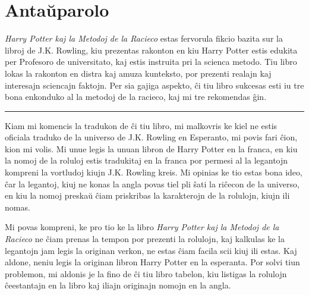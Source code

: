 \chapter*{Antaŭparolo}

\emph{Harry Potter kaj la Metodoj de la Racieco} estas fervorula fikcio
bazita sur la libroj de J.K. Rowling, kiu prezentas rakonton en kiu
Harry Potter estis edukita per Profesoro de universitato, kaj estis
instruita pri la scienca metodo. Tiu libro lokas la rakonton en distra
kaj amuza kunteksto, por prezenti realajn kaj interesajn sciencajn
faktojn. Per sia gajiga aspekto, ĉi tiu libro sukcesas esti iu tre
bona enkonduko al la metodoj de la racieco, kaj mi tre rekomendas
ĝin.

\begin{center}\rule{3in}{0.4pt}\end{center}

Kiam mi komencis la tradukon de ĉi tiu libro, mi malkovris ke kiel ne
estis oficiala traduko de la universo de J.K. Rowling en Esperanto, mi
povis fari ĉion, kion mi volis. Mi unue legis la unuan libron de Harry
Potter en la franca, en kiu la nomoj de la roluloj estis tradukitaj en
la franca por permesi al la legantojn kompreni la vortludoj kiujn
J.K. Rowling kreis. Mi opinias ke tio estas bona ideo, ĉar la
legantoj, kiuj ne konas la angla povas tiel pli ŝati la riĉecon de la
universo, en kiu la nomoj preskaŭ ĉiam priskribas la karakterojn de la
rolulojn, kiujn ili nomas.

Mi povas kompreni, ke pro tio ke la libro \emph{Harry Potter kaj la
Metodoj de la Racieco} ne ĉiam prenas la tempon por prezenti la
rolulojn, kaj kalkulas ke la legantojn jam legis la originan verkon,
ne estas ĉiam facila scii kiuj ili estas. Kaj aldone, neniu legis
la originan libron Harry Potter en la esperanta. Por solvi tiun
problemon, mi aldonis je la fino de ĉi tiu libro tabelon, kiu listigas
la rolulojn ĉeestantajn en la libro kaj iliajn originajn nomojn en la
angla.